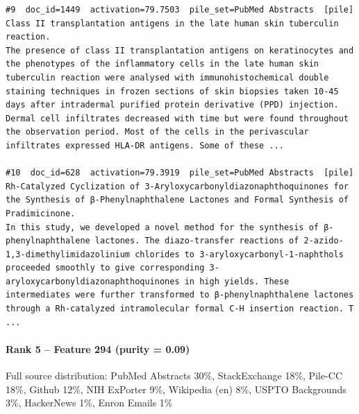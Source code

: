 \begin{verbatim}
#9  doc_id=1449  activation=79.7503  pile_set=PubMed Abstracts  [pile]
Class II transplantation antigens in the late human skin tuberculin reaction.
The presence of class II transplantation antigens on keratinocytes and the phenotypes of the inflammatory cells in the late human skin tuberculin reaction were analysed with immunohistochemical double staining techniques in frozen sections of skin biopsies taken 10-45 days after intradermal purified protein derivative (PPD) injection. Dermal cell infiltrates decreased with time but were found throughout the observation period. Most of the cells in the perivascular infiltrates expressed HLA-DR antigens. Some of these ...

#10  doc_id=628  activation=79.3919  pile_set=PubMed Abstracts  [pile]
Rh-Catalyzed Cyclization of 3-Aryloxycarbonyldiazonaphthoquinones for the Synthesis of β-Phenylnaphthalene Lactones and Formal Synthesis of Pradimicinone.
In this study, we developed a novel method for the synthesis of β-phenylnaphthalene lactones. The diazo-transfer reactions of 2-azido-1,3-dimethylimidazolinium chlorides to 3-aryloxycarbonyl-1-naphthols proceeded smoothly to give corresponding 3-aryloxycarbonyldiazonaphthoquinones in high yields. These intermediates were further transformed to β-phenylnaphthalene lactones through a Rh-catalyzed intramolecular formal C-H insertion reaction. T ...

\end{verbatim}

\paragraph*{Rank 5 -- Feature 294 (purity = 0.09)}

Full source distribution: PubMed Abstracts 30\%, StackExchange 18\%, Pile-CC 18\%, Github 12\%, NIH ExPorter 9\%, Wikipedia (en) 8\%, USPTO Backgrounds 3\%, HackerNews 1\%, Enron Emails 1\%

